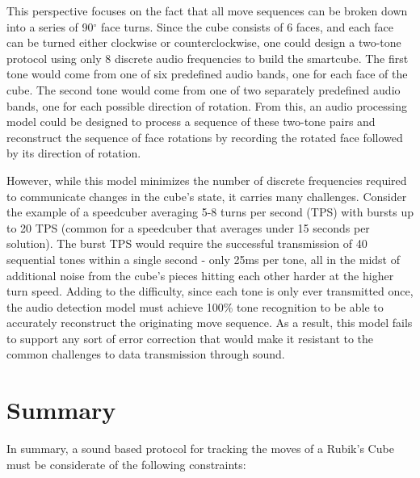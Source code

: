 This perspective focuses on the fact that all move sequences can be
broken down into a series of 90$^\circ$ face turns. Since the cube
consists of 6 faces, and each face can be turned either clockwise or
counterclockwise, one could design a two-tone protocol using only 8
discrete audio frequencies to build the smartcube. The first tone
would come from one of six predefined audio bands, one for each face of
the cube. The second tone would come from one of two separately
predefined audio bands, one for each possible direction of rotation.
From this, an audio processing model could be designed to process a
sequence of these two-tone pairs and reconstruct the sequence of face
rotations by recording the rotated face followed by its direction of
rotation.

However, while this model minimizes the number of discrete frequencies
required to communicate changes in the cube's state, it carries many
challenges. Consider the example of a speedcuber averaging 5-8 turns
per second (TPS) with bursts up to 20 TPS (common for a speedcuber that
averages under 15 seconds per solution). The burst TPS would require
the successful transmission of 40 sequential tones within a single
second - only 25ms per tone, all in the midst of additional noise from
the cube's pieces hitting each other harder at the higher turn speed.
Adding to the difficulty, since each tone is only ever transmitted
once, the audio detection model must achieve 100\% tone recognition to
be able to accurately reconstruct the originating move sequence. As a
result, this model fails to support any sort of error correction that
would make it resistant to the common challenges to data transmission
through sound.

\newpage
\section{Summary}
\label{sec:protocol-summary}

In summary, a sound based protocol for tracking the moves of a Rubik's
Cube must be considerate of the following constraints:

